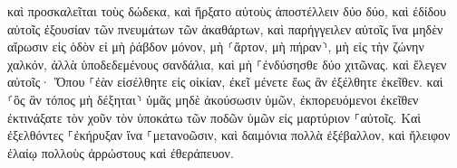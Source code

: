 \documentclass{openreader}
\begin{document}
καὶ προσκαλεῖται τοὺς δώδεκα, καὶ ἤρξατο αὐτοὺς ἀποστέλλειν δύο δύο, καὶ ἐδίδου αὐτοῖς ἐξουσίαν τῶν πνευμάτων τῶν ἀκαθάρτων, 
καὶ παρήγγειλεν αὐτοῖς ἵνα μηδὲν αἴρωσιν εἰς ὁδὸν εἰ μὴ ῥάβδον μόνον, μὴ ⸂ἄρτον, μὴ πήραν⸃, μὴ εἰς τὴν ζώνην χαλκόν, 
ἀλλὰ ὑποδεδεμένους σανδάλια, καὶ μὴ ⸀ἐνδύσησθε δύο χιτῶνας. 
καὶ ἔλεγεν αὐτοῖς· Ὅπου ⸀ἐὰν εἰσέλθητε εἰς οἰκίαν, ἐκεῖ μένετε ἕως ἂν ἐξέλθητε ἐκεῖθεν. 
καὶ ⸂ὃς ἂν τόπος μὴ δέξηται⸃ ὑμᾶς μηδὲ ἀκούσωσιν ὑμῶν, ἐκπορευόμενοι ἐκεῖθεν ἐκτινάξατε τὸν χοῦν τὸν ὑποκάτω τῶν ποδῶν ὑμῶν εἰς μαρτύριον ⸀αὐτοῖς. 
Καὶ ἐξελθόντες ⸀ἐκήρυξαν ἵνα ⸀μετανοῶσιν, 
καὶ δαιμόνια πολλὰ ἐξέβαλλον, καὶ ἤλειφον ἐλαίῳ πολλοὺς ἀρρώστους καὶ ἐθεράπευον. 
\end{document}
